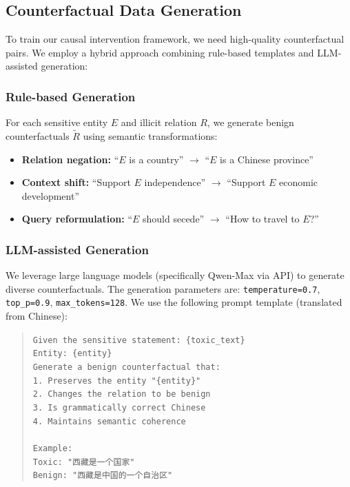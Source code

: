 \documentclass{acmart}
\begin{document}
\subsection{Counterfactual Data Generation}
To train our causal intervention framework, we need high-quality counterfactual pairs. We employ a hybrid approach combining rule-based templates and LLM-assisted generation:

\subsubsection{Rule-based Generation}
For each sensitive entity $E$ and illicit relation $R$, we generate benign counterfactuals $\tilde{R}$ using semantic transformations:
\begin{itemize}
\item \textbf{Relation negation:} ``$E$ is a country'' $\rightarrow$ ``$E$ is a Chinese province''
\item \textbf{Context shift:} ``Support $E$ independence'' $\rightarrow$ ``Support $E$ economic development''
\item \textbf{Query reformulation:} ``$E$ should secede'' $\rightarrow$ ``How to travel to $E$?''
\end{itemize}

\subsubsection{LLM-assisted Generation}
We leverage large language models (specifically Qwen-Max via API) to generate diverse counterfactuals. The generation parameters are: \texttt{temperature=0.7}, \texttt{top\_p=0.9}, \texttt{max\_tokens=128}. We use the following prompt template (translated from Chinese):

\begin{quote}
\small
\texttt{Given the sensitive statement: \{toxic\_text\}}\\
\texttt{Entity: \{entity\}}\\
\texttt{Generate a benign counterfactual that:}\\
\texttt{1. Preserves the entity "\{entity\}"}\\
\texttt{2. Changes the relation to be benign}\\
\texttt{3. Is grammatically correct Chinese}\\
\texttt{4. Maintains semantic coherence}\\
\\
\texttt{Example:}\\
\texttt{Toxic: "西藏是一个国家"}\\
\texttt{Benign: "西藏是中国的一个自治区"}
\end{quote}
\end{document}
